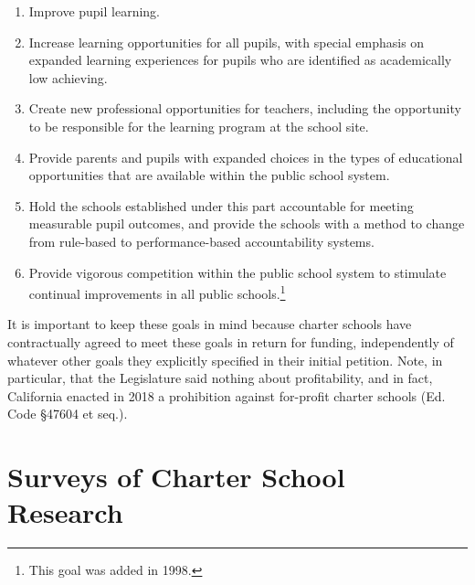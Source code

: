 \begin{enumerate}[label=\alph*)] %
  \item Improve pupil learning.
  \item Increase learning opportunities for all pupils, with special emphasis on expanded learning experiences for
  pupils who are identified as academically low achieving.

  \item Create new professional opportunities for teachers, including the opportunity to be responsible for the learning program at the school site.
  \item Provide parents and pupils with expanded choices in the types of educational opportunities that are available within the public school system.
  \item Hold the schools established under this part accountable for meeting measurable pupil outcomes, and provide the schools with a method to change from rule-based to performance-based accountability systems.
  \item Provide vigorous competition within the public school system to stimulate continual improvements in all public schools.\footnote{This goal was added in 1998.}
\end{enumerate}

It is important to keep these goals in mind because charter schools have contractually agreed to meet these goals in return for funding, independently of whatever other goals they explicitly specified in their initial petition. Note, in particular, that the Legislature said nothing about profitability, and in fact, California enacted in 2018 a prohibition against for-profit charter schools (Ed. Code §47604 et seq.).

\section{Surveys of Charter School Research}\label{sec:charter-surveys}\indent

